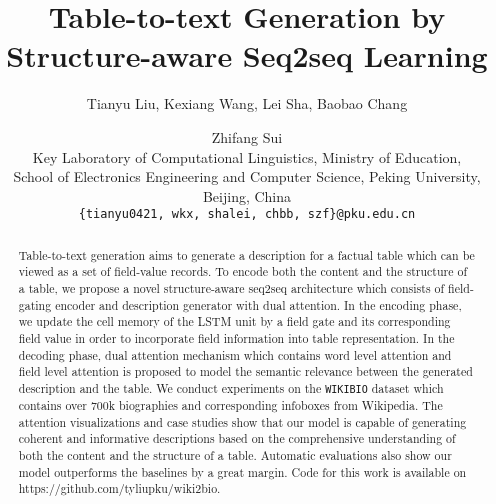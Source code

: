 \documentclass[letterpaper]{article} \usepackage{aaai18}  \usepackage{times}  \usepackage{helvet}  \usepackage{courier}  \usepackage{url}  \usepackage{graphicx}  \frenchspacing  \setlength{\pdfpagewidth}{8.5in}  \setlength{\pdfpageheight}{11in}  \usepackage{amsmath}
\begin{document}
\title{Table-to-text Generation by Structure-aware Seq2seq Learning}

\author{Tianyu Liu, Kexiang Wang, Lei Sha, Baobao Chang \and Zhifang Sui \\
Key Laboratory of Computational Linguistics, Ministry of Education, \\School of Electronics Engineering and Computer Science, Peking University, Beijing, China\\
  {\tt \{tianyu0421, wkx, shalei, chbb, szf\}@pku.edu.cn}}
\maketitle
\begin{abstract}

Table-to-text generation aims to generate a description for a factual table which can be viewed as a set of field-value records.
To encode both the content and the structure of a table,
we propose a novel structure-aware seq2seq architecture 
which consists of field-gating encoder and description generator with dual attention. 
In the encoding phase, we update the cell memory of the LSTM unit by a field gate and its corresponding field value 
in order to incorporate field information into table representation.
In the decoding phase, dual attention mechanism which contains word level attention and field level attention is proposed 
to model the semantic relevance between the generated description and the table.
We conduct experiments on the \texttt{WIKIBIO} dataset which contains over 700k biographies and corresponding infoboxes from Wikipedia. 
The attention visualizations and case studies show that our model is capable of generating coherent and informative descriptions based on the comprehensive understanding of both the content and the structure of a table.
Automatic evaluations also show our model outperforms the baselines by a great margin. Code for this work is available on 
https://github.com/tyliupku/wiki2bio.
\end{abstract}
\end{document}
